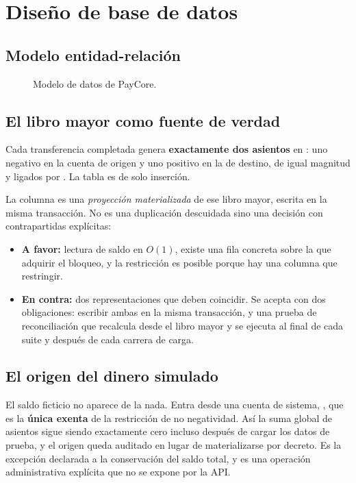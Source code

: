 \section{Diseño de base de datos}
\label{sec:basededatos}

\subsection{Modelo entidad-relación}

\begin{figure}[htbp]
\centering
\resizebox{\textwidth}{!}{}
\caption{Modelo de datos de PayCore.}
\label{fig:er}
\end{figure}

\subsection{El libro mayor como fuente de verdad}

Cada transferencia completada genera \textbf{exactamente dos asientos} en
: uno negativo en la cuenta de origen y uno positivo
en la de destino, de igual magnitud y ligados por . La
tabla es de solo inserción.

La columna  es una \emph{proyección
materializada} de ese libro mayor, escrita en la misma transacción. No es una
duplicación descuidada sino una decisión con contrapartidas explícitas:

\begin{itemize}[leftmargin=1.2em]
  \item \textbf{A favor:} lectura de saldo en $O(1)$, existe una fila concreta
    sobre la que adquirir el bloqueo, y la restricción
     es posible porque hay una columna que
    restringir.
  \item \textbf{En contra:} dos representaciones que deben coincidir. Se
    acepta con dos obligaciones: escribir ambas en la misma transacción, y una
    prueba de reconciliación que recalcula desde el libro mayor y se ejecuta
    al final de cada suite y después de cada carrera de carga.
\end{itemize}

\subsection{El origen del dinero simulado}

El saldo ficticio no aparece de la nada. Entra desde una cuenta de sistema,
, que es la \textbf{única exenta} de la restricción de
no negatividad. Así la suma global de asientos sigue siendo exactamente cero
incluso después de cargar los datos de prueba, y el origen queda auditado en
lugar de materializarse por decreto. Es la excepción declarada a la
conservación del saldo total, y es una operación administrativa explícita que
no se expone por la API. 

